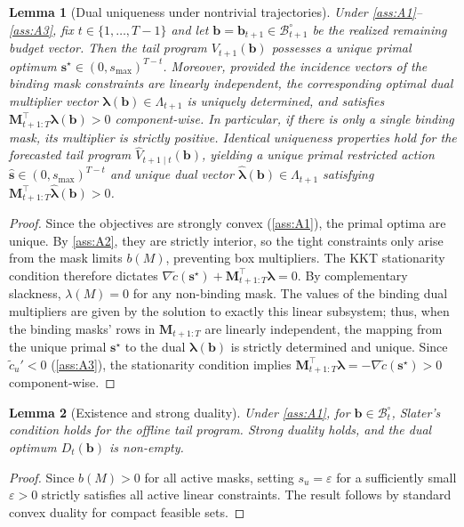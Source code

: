 \documentclass{uai2026} %
\newtheorem{lemma}{Lemma}
\newcommand{\1}{\mathbf{1}}
\renewcommand{\epsilon}{\varepsilon}
\newcommand{\bcal}{\mathcal{B}}
\begin{document}
\begin{lemma}[Dual uniqueness under nontrivial trajectories]
  \label{lem:dual-unique-app}
  Under \ref{ass:A1}--\ref{ass:A3}, fix $t \in \{1,\dots,T-1\}$ and let $\mathbf{b} = \mathbf{b}_{t+1} \in \bcal_{t+1}^\circ$ be the realized remaining budget vector.
  Then the tail program $V_{t+1}(\mathbf{b})$ possesses a unique primal optimum $\mathbf{s}^{\star} \in (0,s_{\max})^{T-t}$.
  Moreover, provided the incidence vectors of the binding mask constraints are linearly independent, the corresponding optimal dual multiplier vector $\boldsymbol{\lambda}(\mathbf{b}) \in \Lambda_{t+1}$ is uniquely determined, and satisfies $\mathbf{M}_{t+1:T}^\top \boldsymbol{\lambda}(\mathbf{b}) > 0$ component-wise. In particular, if there is only a single binding mask, its multiplier is strictly positive.
  Identical uniqueness properties hold for the forecasted tail program $\hat{V}_{t+1\mid t}(\mathbf{b})$, yielding a unique primal restricted action $\hat{\mathbf{s}} \in (0,s_{\max})^{T-t}$ and unique dual vector $\hat{\boldsymbol{\lambda}}(\mathbf{b}) \in \Lambda_{t+1}$ satisfying $\mathbf{M}_{t+1:T}^\top \hat{\boldsymbol{\lambda}}(\mathbf{b}) > 0$.
\end{lemma}
\begin{proof}
  Since the objectives are strongly convex (\ref{ass:A1}), the primal optima are unique. By \ref{ass:A2}, they are strictly interior, so the tight constraints only arise from the mask limits $b(M)$, preventing box multipliers. The KKT stationarity condition therefore dictates $\nabla \tilde{c}(\mathbf{s}^\star) + \mathbf{M}_{t+1:T}^\top \boldsymbol{\lambda} = 0$. By complementary slackness, $\lambda(M) = 0$ for any non-binding mask. The values of the binding dual multipliers are given by the solution to exactly this linear subsystem; thus, when the binding masks' rows in $\mathbf{M}_{t+1:T}$ are linearly independent, the mapping from the unique primal $\mathbf{s}^\star$ to the dual $\boldsymbol{\lambda}(\mathbf{b})$ is strictly determined and unique. Since $\tilde{c}_u' < 0$ (\ref{ass:A3}), the stationarity condition implies $\mathbf{M}_{t+1:T}^\top \boldsymbol{\lambda} = -\nabla \tilde{c}(\mathbf{s}^\star) > 0$ component-wise.
\end{proof}

\begin{lemma}[Existence and strong duality]
  \label{lem:slater-attainment}
  Under \ref{ass:A1}, for $\mathbf{b} \in \bcal_t^\circ$, Slater's condition holds for the offline tail program. Strong duality holds, and the dual optimum $D_t(\mathbf{b})$ is non-empty.
\end{lemma}
\begin{proof}
  Since $b(M)>0$ for all active masks, setting $s_u = \epsilon$ for a sufficiently small $\epsilon>0$ strictly satisfies all active linear constraints. The result follows by standard convex duality for compact feasible sets.
\end{proof}
\end{document}
